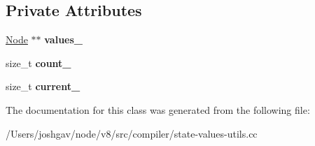 \subsection*{Private Attributes}
\begin{DoxyCompactItemize}
\item 
\hyperlink{classv8_1_1internal_1_1compiler_1_1_node}{Node} $\ast$$\ast$ {\bfseries values\+\_\+}\hypertarget{classv8_1_1internal_1_1compiler_1_1_state_values_cache_1_1_value_array_iterator_a01a6b28a185e5e3304f1e2b78959e782}{}\label{classv8_1_1internal_1_1compiler_1_1_state_values_cache_1_1_value_array_iterator_a01a6b28a185e5e3304f1e2b78959e782}

\item 
size\+\_\+t {\bfseries count\+\_\+}\hypertarget{classv8_1_1internal_1_1compiler_1_1_state_values_cache_1_1_value_array_iterator_ae3d4bde8325044ab0e346738f894da23}{}\label{classv8_1_1internal_1_1compiler_1_1_state_values_cache_1_1_value_array_iterator_ae3d4bde8325044ab0e346738f894da23}

\item 
size\+\_\+t {\bfseries current\+\_\+}\hypertarget{classv8_1_1internal_1_1compiler_1_1_state_values_cache_1_1_value_array_iterator_a3a5055a6c7802c0faa8348b6ea27fcf4}{}\label{classv8_1_1internal_1_1compiler_1_1_state_values_cache_1_1_value_array_iterator_a3a5055a6c7802c0faa8348b6ea27fcf4}

\end{DoxyCompactItemize}


The documentation for this class was generated from the following file\+:\begin{DoxyCompactItemize}
\item 
/\+Users/joshgav/node/v8/src/compiler/state-\/values-\/utils.\+cc\end{DoxyCompactItemize}
